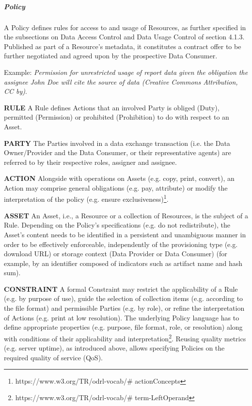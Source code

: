



\subparagraph*{Policy}
A Policy defines rules for access to and usage of Resources, as further specified in the subsections on Data Access Control and Data Usage Control of section 4.1.3.
Published as part of a Resource’s metadata, it constitutes a contract offer to be further negotiated and agreed upon by the prospective Data Consumer. 

Example: \textit{Permission for unrestricted usage of report data given the obligation the assignee John Doe will cite the source of data (Creative Commons Attribution, CC by)}.

\textbf{RULE} A Rule defines Actions that an involved Party is obliged (Duty), permitted (Permission) or prohibited (Prohibition) to do with respect to an Asset.

\textbf{PARTY }The Parties involved in a data exchange transaction (i.e. the Data Owner/Provider and the Data Consumer, or their representative agents) are referred to by their respective roles, assigner and assignee. 

\textbf{ACTION} Alongside with operations on Assets (e.g. copy, print, convert), an Action may comprise general obligations (e.g. pay, attribute) or modify the interpretation of the policy (e.g. ensure exclusiveness)\footnote{https://www.w3.org/TR/odrl-vocab/$\#$ actionConcepts }. 

\textbf{ASSET }An Asset, i.e., a Resource or a collection of Resources, is the subject of a Rule. Depending on the Policy’s specifications (e.g. do not redistribute), the Asset’s content needs to be identified in a persistent and unambiguous manner in order to be effectively enforceable, independently of the provisioning type (e.g. download URL) or storage context (Data Provider or Data Consumer) (for example, by an identifier composed of indicators such as artifact name and hash sum).

\textbf{CONSTRAINT} A formal Constraint may restrict the applicability of a Rule (e.g. by purpose of use), guide the selection of collection items (e.g. according to the file format) and permissible Parties (e.g. by role), or refine the interpretation of Actions (e.g. print at low resolution). The underlying Policy language has to define appropriate properties (e.g. purpose, file format, role, or resolution) along with conditions of their applicability and interpretation\footnote{https://www.w3.org/TR/odrl-vocab/$\#$ term-LeftOperand }. Reusing quality metrics (e.g. server uptime), as introduced above, allows specifying Policies on the required quality of service (QoS). 



